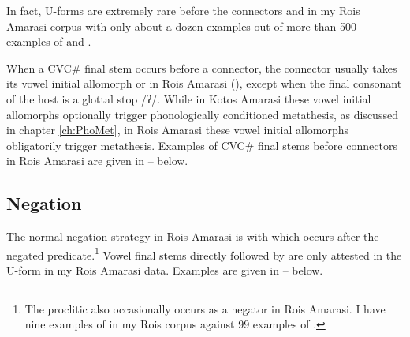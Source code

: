 In fact, U-forms are extremely rare before the connectors
 and  in my Ro{\Q}is Amarasi corpus
with only about a dozen examples out of more than 500 examples
of  and .

When a CVC{\#} final stem occurs before a connector,
the connector usually takes its vowel initial
allomorph  or  in Ro{\Q}is Amarasi (),
except when the final consonant of the host is a glottal stop /ʔ/.
While in Kotos Amarasi these vowel initial allomorphs optionally
trigger phonologically conditioned metathesis, as discussed in chapter \ref{ch:PhoMet},
in Ro{\Q}is Amarasi these vowel initial allomorphs obligatorily trigger metathesis.
Examples of CVC{\#} final stems before connectors in Ro{\Q}is Amarasi
are given in -- below.

\begin{exe}
	\label{ex:RO-170830-4, 7.15}
	\label{ex:RO-170902-1, 2.04}
	\label{ex:RO-170829-1, 13.10}
\end{exe}

\subsection{Negation}\label{sec:RoqNeg}
The normal negation strategy in Ro{\Q}is Amarasi
is with  which occurs after the negated predicate.\footnote{
		The proclitic  also occasionally occurs as a negator
		in Ro{\Q}is Amarasi. I have nine examples of 
		in my Ro{\Q}is corpus against 99 examples of .}
Vowel final stems directly followed by 
are only attested in the U-form in my Ro{\Q}is Amarasi data.
Examples are given in -- below.

